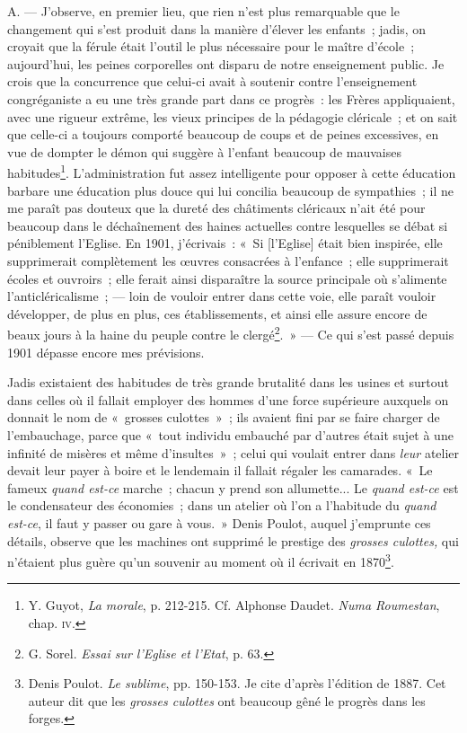 \documentclass[french,twoside]{book} %
\begin{document}
\noindent A. — J’observe, en premier lieu, que rien n’est plus remarquable que le changement qui s’est produit dans la manière d’élever les enfants ; jadis, on croyait que la férule était l’outil le plus nécessaire pour le maître d’école ; aujourd’hui, les peines corporelles ont disparu de notre enseignement public. Je crois que la concurrence que celui-ci avait à soutenir contre l’enseignement congréganiste a eu une très grande part dans ce progrès : les Frères appliquaient, avec une rigueur extrême, les vieux principes de la pédagogie cléricale ; et on sait que celle-ci a toujours comporté beaucoup de coups et de peines excessives, en vue de dompter le démon qui suggère  à l’enfant beaucoup de mauvaises habitudes\footnote{ \noindent Y. Guyot, \emph{La morale}, p. 212-215. Cf. Alphonse Daudet. \emph{Numa Roumestan}, chap. {\scshape iv}.
 }. L’administration fut assez intelligente pour opposer à cette éducation barbare une éducation plus douce qui lui concilia beaucoup de sympathies ; il ne me paraît pas douteux que la dureté des châtiments cléricaux n’ait été pour beaucoup dans le déchaînement des haines actuelles contre lesquelles se débat si péniblement l’Eglise. En 1901, j’écrivais : « Si [l’Eglise] était bien inspirée, elle supprimerait complètement les œuvres consacrées à l’enfance ; elle supprimerait écoles et ouvroirs ; elle ferait ainsi disparaître la source principale où s’alimente l’anticléricalisme ; — loin de vouloir entrer dans cette voie, elle paraît vouloir développer, de plus en plus, ces établissements, et ainsi elle assure encore de beaux jours à la haine du peuple contre le clergé\footnote{ \noindent G. Sorel. \emph{Essai sur l’Eglise et l’Etat}, p. 63.
 }. » — Ce qui s’est passé depuis 1901 dépasse encore mes prévisions.\par
Jadis existaient des habitudes de très grande brutalité dans les usines et surtout dans celles où il fallait employer des hommes d’une force supérieure auxquels on donnait le nom de « grosses culottes » ; ils avaient fini par se faire charger de l’embauchage, parce que « tout individu embauché par d’autres était sujet à une infinité de misères et même d’insultes » ; celui qui voulait entrer dans \emph{leur} atelier devait leur payer à boire et le lendemain il fallait régaler les camarades. « Le fameux \emph{quand est-ce} marche ; chacun y prend son allumette... Le \emph{quand est-ce}  est le condensateur des économies ; dans un atelier où l’on a l’habitude du \emph{quand est-ce}, il faut y passer ou gare à vous. » Denis Poulot, auquel j’emprunte ces détails, observe que les machines ont supprimé le prestige des \emph{grosses culottes,} qui n’étaient plus guère qu’un souvenir au moment où il écrivait en 1870\footnote{ \noindent Denis Poulot. \emph{Le sublime}, pp. 150-153. Je cite d’après l’édition de 1887. Cet auteur dit que les \emph{grosses culottes} ont beaucoup gêné le progrès dans les forges.
 }.\par
\end{document}
